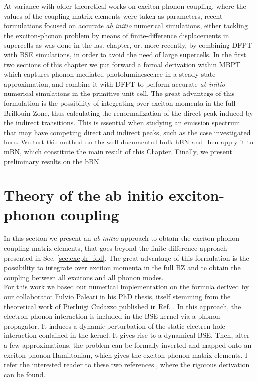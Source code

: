 At variance with older theoretical works on exciton-phonon coupling, where the values of the coupling matrix elements were taken as parameters, recent formulations focused on accurate \emph{ab initio} numerical simulations, either tackling the exciton-phonon problem by means of finite-difference displacements in supercells as was done in the last chapter, or, more recently, by combining \acrshort{DFPT} with \acrshort{BSE} simulations, in order to avoid the need of large supercells.\cite{chen2020exciton}
In the first two sections of this chapter we put forward a formal derivation within \acrshort{MBPT} which captures phonon mediated photoluminescence in a steady-state approximation, and combine it with \acrshort{DFPT} to perform accurate \emph{ab initio} numerical simulations in the primitive unit cell.
The great advantage of this formulation is the possibility of integrating over exciton momenta in the full Brillouin Zone, thus calculating the renormalization of the direct peak induced by the indirect transitions. This is essential when studying an emission spectrum that may have competing direct and indirect peaks, such as the case investigated here. We test this method on the well-documented bulk \acrshort{hBN} and then apply it to \acrshort{mBN}, which constitute the main result of this Chapter. Finally, we present preliminary results on the \acrshort{bBN}.

%
\section{Theory of the ab initio exciton-phonon coupling} \label{sec:excph_ai}
In this section we present an \textit{ab initio} approach to obtain the exciton-phonon coupling matrix elements, that goes beyond the finite-difference approach presented in Sec. \ref{sec:excph_fdd}. The great advantage of this formulation is the possibility to integrate over exciton momenta in the full \acrlong{BZ} and to obtain the coupling between all excitons and all phonon modes.\\

For this work we based our numerical implementation on the formula derived by our collaborator Fulvio Paleari in his PhD thesis, \cite{paleari2019first} itself stemming from the theoretical work of Pierluigi Cudazzo published in Ref. \cite{cudazzo2020first}. In this approach, the electron-phonon interaction is included in the \acrshort{BSE} kernel via a phonon propagator. It induces a dynamic perturbation of the static electron-hole interaction contained in the kernel. It gives rise to a dynamical \acrlong{BSE}. Then, after a few approximations, the problem can be formally inverted and mapped onto an exciton-phonon Hamiltonian, which gives the exciton-phonon matrix elements. I refer the interested reader to these two references \cite{paleari2019first,cudazzo2020first}, where the rigorous derivation can be found.\\

